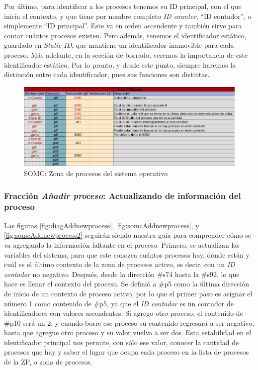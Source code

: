 \documentclass[letterpaper,12pt,oneside]{book}
\begin{document}
            Por último, para identificar a los procesos tenemos su ID principal, con el que
			inicia el contexto, y que tiene
			por nombre completo  \textit{ID counter}, ``ID contador'', o simplemente ``ID principal''. Este va en orden ascendente y también sirve para 
			contar cuántos procesos existen. Pero además, tenemos el identificador
			estático, guardado en \textit{Static ID}, que mantiene un identificador inamovible para cada proceso.
			Más adelante, en la sección de borrado, veremos la importancia de este identificador
			estático. Por lo pronto, y desde este punto, siempre haremos la distinción entre cada identificador, pues sus funciones son distintas.		
			

			
		\begin{figure}[h]		
			\centering
			\includegraphics[scale=0.55]{media/CARDIACC/Zona_De_Procesos.png}
			\caption{SOMC: Zona de procesos del sistema operativo}
			\label{fig:somcZonaDeProcesos}
		\end{figure}

            \subsubsection{Fracción \textit{Añadir proceso}: Actualizando de información del proceso}
            
			Las figuras  \ref{fig:diagAddnewprocess}, \ref{fig:somcAddnewprocess}, y \ref{fig:somcAddnewprocess2} seguirán siendo
			nuestra guía para comprender cómo se va agregando la información faltante en el proceso. Primero, se actualizan las variables del sistema, para 
			que este conozca cuántos procesos hay, dónde 
			están y cuál es el último
			contexto de la zona de procesos activo, es decir, con un \textit{ID contador} no negativo. Después, desde la dirección \#s74 hasta
			la \#s92, lo que hace es llenar el contexto del proceso. Se definió a \#p5 como la última dirección de inicio de un 
			contexto de proceso activo, por lo que el primer paso es asignar el número 1 como contenido de \#p5, ya que el \textit{ID contador} 
			es un 
			contador 
			de identificadores
			con valores ascendentes. Si agrego otro proceso, el contenido de \#p10 será un 2, y cuando borre ese proceso
			su contenido regresará a ser negativo, hasta que agregue otro proceso y su valor vuelva a ser dos. Esta estabilidad en el identificador 
			principal
			nos permite, con sólo ese valor, conocer la cantidad de procesos que hay  y saber el lugar que ocupa cada proceso en la lista
			de procesos de la ZP, o zona de procesos.
			
\end{document}
